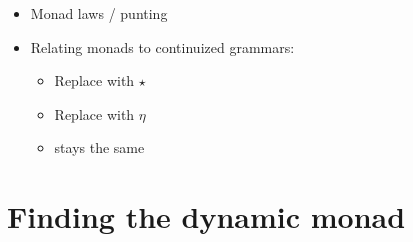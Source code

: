 \begin{itemize}
	\item Monad laws / punting
	
	\item Relating monads to continuized grammars:
	\begin{itemize}
		\item Replace  with $\star$
		\item Replace  with $\eta$
		\item {} stays the same
	\end{itemize}
	
\end{itemize}

\section{Finding the dynamic monad}
